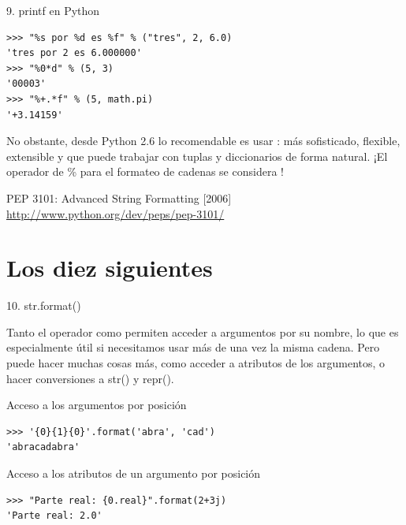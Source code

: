 \documentclass[14pt]{beamer}
\begin{document}
\begin{frame}[fragile]{9. printf en Python}
  \footnotesize
  \begin{exampleblock}{}
    \begin{lstlisting}
>>> "%s por %d es %f" % ("tres", 2, 6.0)
'tres por 2 es 6.000000'
>>> "%0*d" % (5, 3)
'00003'
>>> "%+.*f" % (5, math.pi)
'+3.14159'
    \end{lstlisting}
  \end{exampleblock}

  \begin{alertblock}{}
    \centering
    \small
    No obstante, desde Python 2.6 lo recomendable es usar
    : más sofisticado, flexible, extensible y
    que puede trabajar con tuplas y diccionarios de forma natural. ¡El
    operador de \% para el formateo de cadenas se considera
    !
  \end{alertblock}

  \begin{block}
    {\centering PEP 3101: Advanced String Formatting [2006]}
    \centering \url{http://www.python.org/dev/peps/pep-3101/}
  \end{block}
\end{frame}

\section{Los diez siguientes}

\begin{frame}[fragile]{10. str.format()}
  \small
  \begin{block}{}
    \centering
    Tanto el operador \structure{\%} como 
    permiten acceder a argumentos por su nombre, lo que es
    especialmente útil si necesitamos usar más de una vez la misma
    cadena. Pero  puede hacer muchas cosas
    más, como acceder a atributos de los argumentos, o hacer
    conversiones a str() y repr().
  \end{block}

  \footnotesize
  \begin{exampleblock}
    {Acceso a los argumentos por posición}
    \begin{lstlisting}
>>> '{0}{1}{0}'.format('abra', 'cad')
'abracadabra'
    \end{lstlisting}
  \end{exampleblock}

  \begin{exampleblock}
    {Acceso a los atributos de un argumento por posición}
    \begin{lstlisting}
>>> "Parte real: {0.real}".format(2+3j)
'Parte real: 2.0'
    \end{lstlisting}
  \end{exampleblock}
\end{frame}
\end{document}
